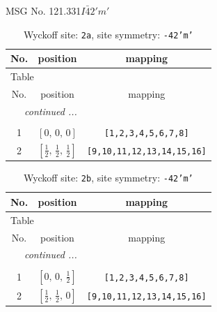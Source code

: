 \documentclass[fleqn,8pt]{jsarticle}
\begin{document}
\setcounter{MaxMatrixCols}{32}

\renewcommand{\tablename}{Table~}
\renewcommand{\figurename}{Figure~}
\begin{center}
\LARGE
MSG No. 121.331\quad$I\bar{4}2'm'$
\end{center}
\renewcommand{\arraystretch}{1.2}
\begin{longtable}{ccc}
\caption{Wyckoff site: {\tt 2a}, site symmetry: {\tt -42'm'}}
 \\
 \hline \hline
No. & position & mapping \\ \hline \endfirsthead

\multicolumn{2}{l}{\tablename\ \thetable{}} \\
 \hline \hline
No. & position & mapping \\ \hline \endhead

 \hline \hline
\multicolumn{2}{r}{\footnotesize\it continued ...} \\ \endfoot

 \hline \hline
\multicolumn{2}{r}{} \\ \endlastfoot

1 & $\left[ 0,\, 0,\, 0 \right]$ & {\tt [1,2,3,4,5,6,7,8]} \\ \hline
2 & $\left[ \frac{1}{2},\, \frac{1}{2},\, \frac{1}{2} \right]$ & {\tt [9,10,11,12,13,14,15,16]} \\
\end{longtable}
\renewcommand{\arraystretch}{1.2}
\begin{longtable}{ccc}
\caption{Wyckoff site: {\tt 2b}, site symmetry: {\tt -42'm'}}
 \\
 \hline \hline
No. & position & mapping \\ \hline \endfirsthead

\multicolumn{2}{l}{\tablename\ \thetable{}} \\
 \hline \hline
No. & position & mapping \\ \hline \endhead

 \hline \hline
\multicolumn{2}{r}{\footnotesize\it continued ...} \\ \endfoot

 \hline \hline
\multicolumn{2}{r}{} \\ \endlastfoot

1 & $\left[ 0,\, 0,\, \frac{1}{2} \right]$ & {\tt [1,2,3,4,5,6,7,8]} \\ \hline
2 & $\left[ \frac{1}{2},\, \frac{1}{2},\, 0 \right]$ & {\tt [9,10,11,12,13,14,15,16]} \\
\end{longtable}
\end{document}
